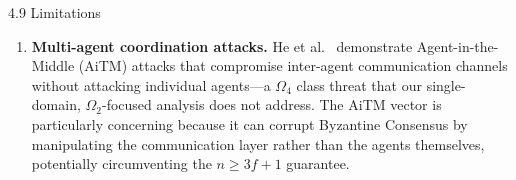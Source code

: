 \documentclass[
  ignorenonframetext,
]{beamer}
\begin{document}
\begin{frame}[allowframebreaks]{4.9 Limitations}
\begin{enumerate}
  Protocol (2024--2025) and tool-calling frameworks introduces a new
  attack surface---tool poisoning---not addressed in the current
  \(\Omega_2\) analysis. Recent benchmarks show high attack success
  rates on real MCP server deployments, suggesting that the boundary
  between tool integration and data ingestion may itself constitute a
  novel adversary class between \(\Omega_2\) and \(\Omega_3\).
\item
  \textbf{Multi-agent coordination attacks.} He et
  al.~\cite{he2025redteaming} demonstrate Agent-in-the-Middle (AiTM)
  attacks that compromise inter-agent communication channels without
  attacking individual agents---a \(\Omega_4\) class threat that our
  single-domain, \(\Omega_2\)-focused analysis does not address. The
  AiTM vector is particularly concerning because it can corrupt
  Byzantine Consensus by manipulating the communication layer rather
  than the agents themselves, potentially circumventing the
  \(n \geq 3f+1\) guarantee.
\end{enumerate}
\end{frame}
\end{document}
